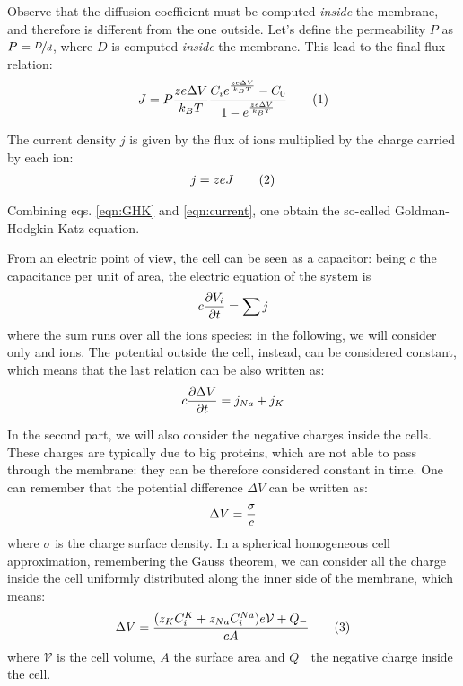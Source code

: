 \documentclass[11pt,a4 paper]{article}
\let\oldfrac\frac
\renewcommand{\frac}[3][d]{\ifthenelse{\equal{#1}{d}}{\oldfrac{#2}{#3}}{\nicefrac{#2}{#3}}}
\newcommand\numberthis{\addtocounter{equation}{1}\tag{\theequation}}
\begin{document}
Observe that the diffusion coefficient must be computed \emph{inside} the membrane, and therefore is different from the one outside. Let's define the permeability $P$ as $P = \frac[f]{D}{d}$, where $D$ is computed \emph{inside} the membrane. This lead to the final flux relation:
\begin{align*}
    J = P\frac{ze\Delta V}{k_BT} \frac{C_ie^{\frac{ze\Delta V}{k_BT} } - C_0 }{1 - e^{\frac{ze\Delta V}{k_BT} }} \numberthis \label{eqn:GHK}
\end{align*}

The current density $j$ is given by the flux of ions multiplied by the charge carried by each ion:
\begin{align*}
    j = zeJ \numberthis \label{eqn:current}
\end{align*}

Combining eqs. \eqref{eqn:GHK} and \eqref{eqn:current}, one obtain the so-called Goldman-Hodgkin-Katz equation.

\bigskip
From an electric point of view, the cell can be seen as a capacitor: being $c$ the capacitance per unit of area, the electric equation of the system is
\begin{align*}
    c \pdv{V_i}{t} = \sum j
\end{align*}
where the sum runs over all the ions species: in the following, we will consider only  and  ions. The potential outside the cell, instead, can be considered constant, which means that the last relation can be also written as:
\begin{align*}
    c \pdv{\Delta V}{t} = j_{Na} + j_K
\end{align*}

\bigskip
In the second part, we will also consider the negative charges inside the cells. These charges are typically due to big proteins, which are not able to pass through the membrane: they can be therefore considered constant in time. One can remember that the potential difference $\Delta V$ can be written as:
\begin{align*}
    \Delta V = \frac{\sigma}{c}
\end{align*}
where $\sigma$ is the charge surface density. In a spherical homogeneous cell approximation, remembering the Gauss theorem, we can consider all the charge inside the cell uniformly distributed along the inner side of the membrane, which means:
\begin{align*}
    \Delta V = \frac{(z_KC_i^K + z_{Na}C_i^{Na})e\mathcal{V} + Q_-}{cA} \numberthis \label{eqn:potwithchar}
\end{align*}
where $\mathcal{V}$ is the cell volume, $A$ the surface area and $Q_-$ the negative charge inside the cell.
\end{document}
